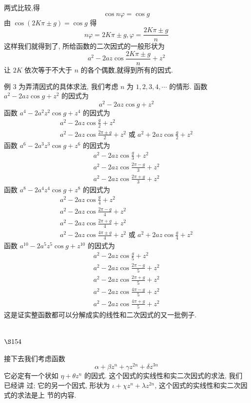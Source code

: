 两式比较,得
\[
\cos n \varphi=\cos g
\]
由 $\cos (2 K \pi \pm g)=\cos g$ 得
\[
n \varphi=2 K \pi \pm g, \varphi=\frac{2 K \pi \pm g}{n}
\]
这样我们就得到了, 所给函数的二次因式的一般形状为
\[
a^{2}-2 a z \cos \frac{2 K \pi \pm g}{n}+z^{2}
\]
让 $2 K$ 依次等于不大于 $n$ 的各个偶数,就得到所有的因式.

例 3 为弄清因式的具体求法, 我们考虑 $n$ 为 $1,2,3,4, \cdots$ 的情形. 函数 $a^{2}-2 a z \cos g+z^{2}$ 的因式为
\[
a^{2}-2 a z \cos g+z^{2}
\]
函数 $a^{4}-2 a^{2} z^{2} \cos g+z^{4}$ 的因式为
\[
\begin{gathered}
a^{2}-2 a z \cos \frac{g}{2}+z^{2} \\
a^{2}-2 a z \cos \frac{2 \pi \pm g}{2}+z^{2} \text { 或 } a^{2}+2 a z \cos \frac{g}{2}+z^{2}
\end{gathered}
\]
函数 $a^{6}-2 a^{3} z^{3} \cos g+z^{6}$ 的因式为
\[
\begin{gathered}
a^{2}-2 a z \cos \frac{g}{3}+z^{2} \\
a^{2}-2 a z \cos \frac{2 \pi-g}{3}+z^{2} \\
a^{2}-2 a z \cos \frac{2 \pi+g}{3}+z^{2}
\end{gathered}
\]
函数 $a^{8}-2 a^{4} z^{4} \cos g+z^{8}$ 的因式为
\[
\begin{gathered}
a^{2}-2 a z \cos \frac{g}{4}+z^{2} \\
a^{2}-2 a z \cos \frac{2 \pi-g}{4}+z^{2} \\
a^{2}-2 a z \cos \frac{2 \pi+g}{4}+z^{2} \\
a^{2}-2 a z \cos \frac{4 \pi \pm g}{4}+z^{2} \text { 或 } a^{2}+2 a z \cos \frac{g}{4}+z^{2}
\end{gathered}
\]
函数 $a^{10}-2 a^{5} z^{5} \cos g+z^{10}$ 的因式为
\[
\begin{gathered}
a^{2}-2 a z \cos \frac{g}{5}+z^{2} \\
a^{2}-2 a z \cos \frac{2 \pi-g}{5}+z^{2} \\
a^{2}-2 a z \cos \frac{2 \pi+g}{5}+z^{2} \\
a^{2}-2 a z \cos \frac{4 \pi-g}{5}+z^{2} \\
a^{2}-2 a z \cos \frac{4 \pi+g}{5}+z^{2}
\end{gathered}
\]
这是证实整函数都可以分解成实的线性和二次因式的又一批例子.

\section{$\S 154$}

接下去我们考虑函数
\[
\alpha+\beta z^{n}+\gamma z^{2 n}+\delta z^{3 n}
\]
它必定有一个状如 $\eta+\theta z^{n}$ 的因式. 这个因式的实线性和实二次因式的求法, 我们已经讲 过; 它的另一个因式, 形状为 $\iota+\chi z^{n}+\lambda z^{2 n}$, 这个因式的实线性和实二次因式的求法是上 节的内容. 

